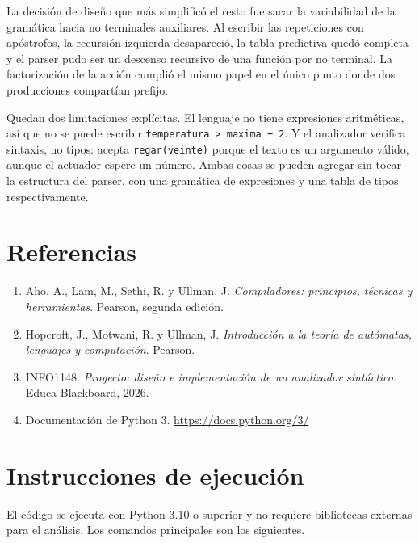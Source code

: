 \documentclass[11pt,letterpaper]{article}
\newcommand{\code}[1]{\texttt{#1}}
\newcommand{\dq}{\textquotedbl{}}
\begin{document}
La decisión de diseño que más simplificó el resto fue sacar la variabilidad de la gramática hacia no terminales auxiliares. Al escribir las repeticiones con apóstrofos, la recursión izquierda desapareció, la tabla predictiva quedó completa y el parser pudo ser un descenso recursivo de una función por no terminal. La factorización de la acción cumplió el mismo papel en el único punto donde dos producciones compartían prefijo.

Quedan dos limitaciones explícitas. El lenguaje no tiene expresiones aritméticas, así que no se puede escribir \code{temperatura > maxima + 2}. Y el analizador verifica sintaxis, no tipos: acepta \code{regar(\dq veinte\dq)} porque el texto es un argumento válido, aunque el actuador espere un número. Ambas cosas se pueden agregar sin tocar la estructura del parser, con una gramática de expresiones y una tabla de tipos respectivamente.

\section{Referencias}

\begin{enumerate}[leftmargin=1.4em]
\item Aho, A., Lam, M., Sethi, R. y Ullman, J. \textit{Compiladores: principios, técnicas y herramientas}. Pearson, segunda edición.
\item Hopcroft, J., Motwani, R. y Ullman, J. \textit{Introducción a la teoría de autómatas, lenguajes y computación}. Pearson.
\item INFO1148. \textit{Proyecto: diseño e implementación de un analizador sintáctico}. Educa Blackboard, 2026.
\item Documentación de Python 3. \url{https://docs.python.org/3/}
\end{enumerate}

\appendix

\section{Instrucciones de ejecución}

El código se ejecuta con Python 3.10 o superior y no requiere bibliotecas externas para el análisis. Los comandos principales son los siguientes.
\end{document}
